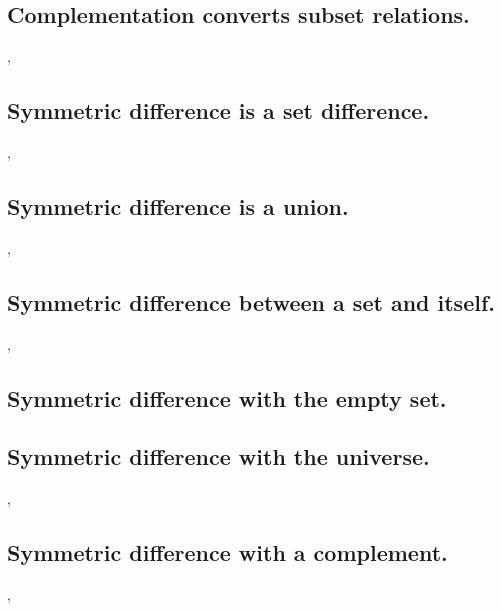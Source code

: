 \documentclass[preview]{standalone}
\begin{document}
\subsection{Complementation converts subset relations.}

\sep
\pagebreak


\subsection{Symmetric difference is a set difference.}

\sep
\pagebreak


\subsection{Symmetric difference is a union.}

\sep


\subsection{Symmetric difference between a set and itself.}

\sep


\subsection{Symmetric difference with the empty set.}

\pagebreak


\subsection{Symmetric difference with the universe.}

\sep


\subsection{Symmetric difference with a complement.}

\sep
\end{document}
